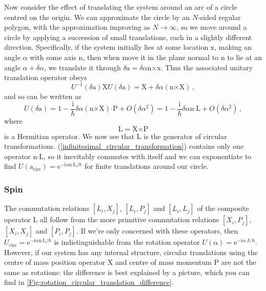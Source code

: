 \documentclass{article}
\theoremstyle{plain}\theoremheaderfont{\normalfont\itshape}\theorembodyfont{\rmfamily}\theoremseparator{.}\newtheorem*{rem}{Remark}\newtheorem*{ex}{Example}\newtheorem*{proof}{Proof}\newtheorem*{altp}{Alternative proof}
\theoremstyle{plain}\theoremheaderfont{\normalfont\bfseries}\theorembodyfont{\rmfamily}\theoremseparator{.}\newtheorem{thm}{Theorem}[section]\newtheorem{lem}[thm]{Lemma}\newtheorem{prop}[thm]{Proposition}\newtheorem*{cor}{Corollary}\newtheorem{defn}[thm]{Definition}\newtheorem{clm}[thm]{Claim}\newtheorem{clminproof}{Claim}
\theoremstyle{break}\theoremheaderfont{\normalfont\itshape}\theorembodyfont{\rmfamily}\theoremseparator{.\medskip}\newtheorem*{proofskip}{Proof}\newtheorem*{exs}{Examples}\newtheorem*{rems}{Remarks}
\theoremstyle{break}\theoremheaderfont{\normalfont\bfseries}\theorembodyfont{\rmfamily}\theoremseparator{.\medskip}\newtheorem{lemskip}[thm]{Lemma}\newtheorem{defnskip}[thm]{Definition}\newtheorem{propskip}[thm]{Proposition}\newtheorem{thmskip}[thm]{Theorem}
\numberwithin{equation}{section}
\newcommand{\ii}{\mathrm{i}}
\newcommand{\ee}{\mathrm{e}}
\newcommand{\vb}[1]{\bm{\mathrm{#1}}}
\newcommand{\cross}{\bm{\times}}
\newcommand{\vdot}{\bm{\cdot}}
\begin{document}
    Now consider the effect of translating the system around an arc of a circle centred on the origin. We can approximate the circle by an \(N\)-sided regular polygon, with the approximation improving as \(N\to\infty\), so we move around a circle by applying a succession of small translations, each in a slightly different direction. Specifically, if the system initially lies at some location \(\vb{x}\), making an angle \(\alpha\) with some axis \(\vb{n}\), then when move it in the plane normal to \(\vb{n}\) to lie at an angle \(\alpha+\delta\alpha\), we translate it through \(\delta\vb{a}=\delta\alpha\vb{n}\cross\vb{x}\). Thus the associated unitary translation operator obeys
    \begin{equation}
        U^{-1}(\delta\vb{a})\vb{X}U(\delta\vb{a})=\vb{X}+\delta\alpha(\vb{n}\cross\vb{X})\,,
    \end{equation}
    and so can be written as
    \begin{equation}\label{infinitesimal_circular_transformation}
        U(\delta\vb{a})=1-\frac{\ii}{\hbar}\delta\alpha(\vb{n}\cross\vb{X})\vdot\vb{P}+O(\delta\alpha^2)=1-\frac{\ii}{\hbar}\delta\alpha\vb{n}\vdot\vb{L}+O(\delta\alpha^2)\,,
    \end{equation}
    where
    \begin{equation}
        \vb{L}=\vb{X}\cross\vb{P}
    \end{equation}
    is a Hermitian operator. We now see that \(\vb{L}\) is the generator of circular transformations. (\ref{infinitesimal_circular_transformation}) contains only one operator \(\vb{n}\vdot\vb{L}\), so it inevitably commutes with itself and we can exponentiate to find \(U(\vb{a}_{\text{circ}})=\ee^{-\ii \alpha\vb{n}\vdot\vb{L}/\hbar}\) for finite translations around our circle.

    \subsubsection{Spin}
    The commutation relations \([L_i,X_j]\), \([L_i,P_j]\) and \([L_i,L_j]\) of the composite operator \(\vb{L}\) all follow from the more primitive commutation relations \([X_i,P_j]\), \([X_i,X_j]\) and \([P_i,P_j]\). If we're only concerned with these operators, then \(U_{\text{circ}}=\ee^{-\ii \alpha\vb{n}\vdot\vb{L}/\hbar}\) is indistinguishable from the rotation operator \(U(\vb{\alpha})=\ee^{-\ii \vb{\alpha}\vdot\vb{J}/\hbar}\). However, if our system has any internal structure, circular translations using the centre of mass position operator \(\vb{X}\) and centre of mass momentum \(\vb{P}\) are not the same as rotations:  the difference is best explained by a picture, which you can find in \cref{Fig:rotation_circular_translation_difference}.
\end{document}
